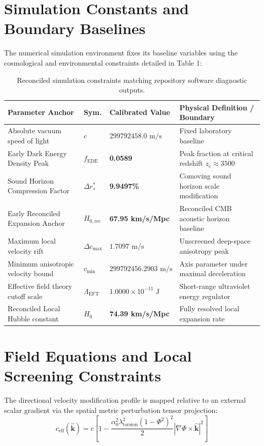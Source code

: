 \documentclass[11pt,a4paper]{article}
\begin{document}
	\section{Simulation Constants and Boundary Baselines}
	The numerical simulation environment fixes its baseline variables using the cosmological and environmental constraints detailed in Table 1:
	\begin{table}[h!]
		\centering
		\small
		\begin{tabular}{llp{1.4in}p{2.3in}}
			\toprule
			\textbf{Parameter Anchor} & \textbf{Sym.} & \textbf{Calibrated Value} & \textbf{Physical Definition / Boundary} \\
			\midrule
			Absolute vacuum speed of light & $c$ & $299792458.0 \text{ m/s}$ & Fixed laboratory baseline \\
			Early Dark Energy Density Peak & $f_{\text{EDE}}$ & \textbf{0.0589} & Peak fraction at critical redshift $z_c \approx 3500$ \\
			Sound Horizon Compression Factor & $\Delta r_s^*$ & \textbf{9.9497\%} & Comoving sound horizon scale modification \\
			Early Reconciled Expansion Anchor & $H_{0,\text{rec}}$ & \textbf{67.95 km/s/Mpc} & Reconciled CMB acoustic horizon baseline \\
			Maximum local velocity rift & $\Delta c_{\text{max}}$ & $1.7097 \text{ m/s}$ & Unscreened deep-space anisotropy peak \\
			Minimum anisotropic velocity bound & $c_{\text{min}}$ & $299792456.2903 \text{ m/s}$ & Axis parameter under maximal deceleration \\
			Effective field theory cutoff scale & $\Lambda_{\text{EFT}}$ & $1.0000 \times 10^{-11} \text{ J}$ & Short-range ultraviolet energy regulator \\
			Reconciled Local Hubble constant & $H_0$ & \textbf{74.39 km/s/Mpc} & Fully resolved local expansion rate \\
			\bottomrule
		\end{tabular}
		\caption{Reconciled simulation constraints matching repository software diagnostic outputs.}
	\end{table}
	
	\section{Field Equations and Local Screening Constraints}
	The directional velocity modification profile is mapped relative to an external scalar gradient via the spatial metric perturbation tensor projection:
	\begin{equation}
		c_{\text{eff}}(\hat{\mathbf{k}}) = c \left[ 1 - \frac{\alpha_0^2 \lambda_{\text{torsion}}^2 (1 - \Phi^2)^2}{2} |\nabla\Phi \times \hat{\mathbf{k}}|^2 \right]
	\end{equation}
	
\end{document}
